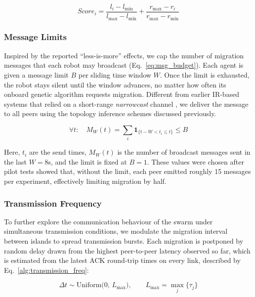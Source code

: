 \documentclass[conference]{IEEEtran}
\begin{document}
\begin{equation}\label{eq:comm-aware}
Score_i =
\frac{l_i - l_{\min}}{l_{\max} - l_{\min}} +
\frac{r_{\max} - r_i}{r_{\max} - r_{\min}}
\end{equation}

\subsubsection{Message Limits}\label{sec:limited-rate}

Inspired by the reported “less-is-more” effects, we cap the number of migration messages that each robot may broadcast (Eq.~\ref{eq:msg_budget}). Each agent is given a message limit $B$ per sliding time window $W$. Once the limit is exhausted, the robot stays silent until the window advances, no matter how often its onboard genetic algorithm requests migration.  Different from earlier IR-based systems that relied on a short-range \emph{narrowcast} channel \cite{aust_hidden_2022}, we deliver the message to all peers using the topology inference schemes discussed previously.

\begin{equation}\label{eq:msg_budget}
\forall t:\quad M_W(t)=\sum_{i}\mathbf{1}_{\{t-W< t_i \le t\}} \le B
\end{equation}

Here, $t_i$ are the send times, $M_W(t)$ is the number of broadcast messages sent in the last $W=8$s, and the limit is fixed at $B=1$. These values were chosen after pilot tests showed that, without the limit, each peer emitted roughly 15 messages per experiment, effectively limiting migration by half. \\

\subsubsection{Transmission Frequency}\label{sec:transmission-frequency}

To further explore the communication behaviour of the swarm under simultaneous transmission conditions, we modulate the migration interval between islands to spread transmission bursts. Each migration is postponed by random delay drawn from the highest peer-to-peer latency observed so far, which is estimated from the latest ACK round-trip times on every link, described by Eq.~\ref{alg:transmission_freq}:

\begin{equation}\label{alg:transmission_freq}
\Delta t \sim \mathrm{Uniform}\bigl(0,\,L_{\max}\bigr), 
\qquad
L_{\max} = \max_{j}\{\tau_{j}\}
\end{equation}
\end{document}
